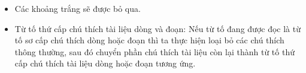 \begin{itemize}
  \item Các khoảng trắng sẽ được bỏ qua.
  
              
  
  \item Từ tố thứ cấp chú thích tài liệu dòng và đoạn: Nếu từ tố đang được đọc là từ tố sơ cấp chú thích dòng hoặc đoạn thì ta thực hiện loại bỏ các chú thích thông thường, sau đó chuyển phần chú thích tài liệu còn lại thành từ tố thứ cấp chú thích tài liệu dòng hoặc đoạn tương ứng.
  

  
  
  
              

\end{itemize}
